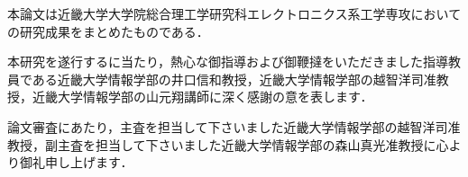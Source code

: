 本論文は近畿大学大学院総合理工学研究科エレクトロニクス系工学専攻においての研究成果をまとめたものである．

本研究を遂行するに当たり，熱心な御指導および御鞭撻をいただきました指導教員である近畿大学情報学部の井口信和教授，近畿大学情報学部の越智洋司准教授，近畿大学情報学部の山元翔講師に深く感謝の意を表します．

論文審査にあたり，主査を担当して下さいました近畿大学情報学部の越智洋司准教授，副主査を担当して下さいました近畿大学情報学部の森山真光准教授に心より御礼申し上げます．